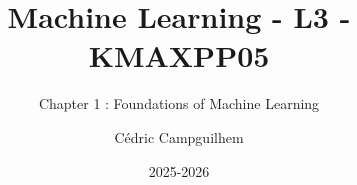 \documentclass[10pt,handout]{beamer}  %
\title{Machine Learning - L3 - KMAXPP05}
\subtitle{Chapter 1 : Foundations of Machine Learning}
\author{Cédric Campguilhem}
\institute[]{
	Airbus Operations \\
	\href{mailto:cedric.campguilhem@airbus.com}{\texttt{cedric.campguilhem@airbus.com}}
}
\date{2025-2026}
\begin{document}
\begin{frame}
  \titlepage
\end{frame}







\end{document}
